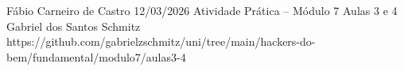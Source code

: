 \documentclass{article}
\begin{document}
{Fábio Carneiro de Castro}
{12/03/2026}
{Atividade Prática -- Módulo 7}
{Aulas 3 e 4}
{Gabriel dos Santos Schmitz}
{https://github.com/gabrielzschmitz/uni/tree/main/hackers-do-bem/fundamental/modulo7/aulas3-4}




\newpage
\printbibliography[title=Referências]
\end{document}
